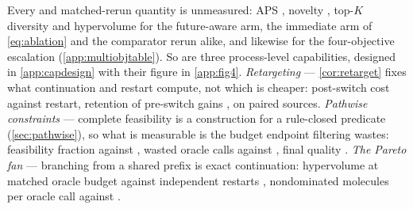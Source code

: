 Every \method{} and matched-rerun quantity is unmeasured: APS \XXX{}, novelty \XXX{}, top-$K$ diversity \XXX{} and hypervolume \XXX{} for the future-aware arm, the immediate arm of \eqref{eq:ablation} and the comparator rerun alike, and likewise \XXX{} for the four-objective escalation (\cref{app:multiobjtable}).
So are three process-level capabilities, designed in \cref{app:capdesign} with their figure in \cref{app:fig4}.
\emph{Retargeting} --- \cref{cor:retarget} fixes what continuation and restart compute, not which is cheaper: post-switch cost \XXX{} against restart, retention of pre-switch gains \XXX{}, on \XXX{} paired sources.
\emph{Pathwise constraints} --- complete feasibility is a construction for a rule-closed predicate (\cref{sec:pathwise}), so what is measurable is the budget endpoint filtering wastes: feasibility fraction \XXX{} against \XXX{}, wasted oracle calls \XXX{} against \XXX{}, final quality \XXX{}.
\emph{The Pareto fan} --- branching from a shared prefix is exact continuation: hypervolume at matched oracle budget \XXX{} against independent restarts \XXX{}, nondominated molecules per oracle call \XXX{} against \XXX{}.
